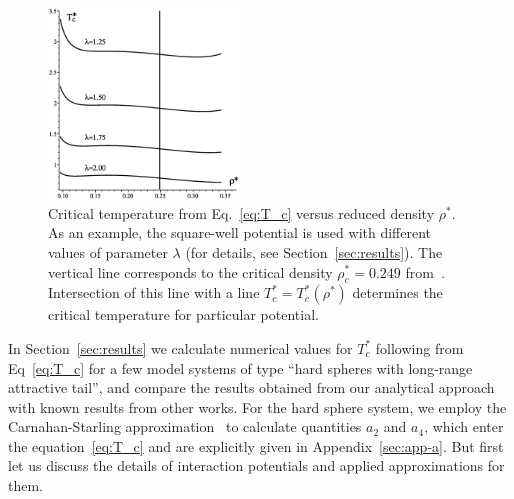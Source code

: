 \begin{figure}[htbp]
	\includegraphics[width=0.45\textwidth,angle=0]{critical_temp_vs_rho}
	\caption{Critical temperature from Eq.~\eqref{eq:T_c} versus reduced density $\rho^*$. As an example, the square-well potential is used with different values of parameter $\lambda$ (for details, see Section~\ref{sec:results}). The vertical line corresponds to the critical density $\rho^*_c=0.249$ from~\cite{YukhJSP1995}. Intersection of this line with a line $T_c^* = T_c^*(\rho^*)$ determines the critical temperature for particular potential.}
	\label{fig:t_c_vs_rho}
\end{figure}

In Section~\ref{sec:results} we calculate numerical values for $T^*_c$ following from Eq~\eqref{eq:T_c} for a few model systems of type ``hard spheres with long-range attractive tail'', and compare the results obtained from our analytical approach with known results from other works. For the hard sphere system, we employ the Carnahan-Starling approximation~\cite{CarnahanStarling1969} to calculate quantities $a_2$ and $a_4$, which enter the equation~\eqref{eq:T_c} and are explicitly given in Appendix~\ref{sec:app-a}. But first let us discuss the details of interaction potentials and applied approximations for them.
